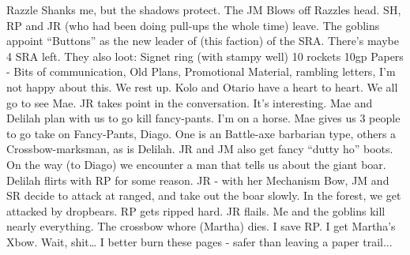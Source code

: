 Razzle Shanks me, but the shadows protect.
The JM Blows off Razzles head.
SH, RP and JR (who had been doing pull-ups the whole time) leave.
The goblins appoint “Buttons” as the new leader of (this faction) of the SRA.
There's maybe 4 SRA left.
They also loot: Signet ring (with stampy well) 10 rockets 10gp
Papers - Bits of communication, Old Plans, Promotional Material, rambling letters,
I’m not happy about this.
We rest up.
Kolo and Otario have a heart to heart.
We all go to see Mae. JR takes point in the conversation. It’s interesting. Mae and Delilah plan with us to go kill fancy-pants.
I’m on a horse.
Mae gives us 3 people to go take on Fancy-Pants, Diago. One is an Battle-axe barbarian type, others a Crossbow-marksman, as is Delilah.
JR and JM also get fancy “dutty ho” boots.
On the way (to Diago) we encounter a man that tells us about the giant boar. Delilah flirts with RP for some reason.
JR - with her Mechanism Bow, JM and SR decide to attack at ranged, and take out the boar slowly.
In the forest, we get attacked by dropbears.
RP gets ripped hard. JR flails.
Me and the goblins kill nearly everything.
The crossbow whore (Martha) dies.
I save RP.
I get Martha’s Xbow.
Wait, shit… I better burn these pages - safer than leaving a paper trail... 
\clearpage